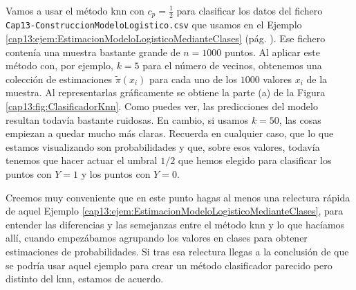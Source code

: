 \begin{ejemplo}
\label{cap13:ejem:clasificadorKnn}

Vamos a usar el método knn con $c_p = \frac{1}{2}$ para clasificar los datos del fichero {\tt Cap13-ConstruccionModeloLogistico.csv} que usamos en el Ejemplo \ref{cap13:ejem:EstimacionModeloLogisticoMedianteClases} (pág. \pageref{cap13:ejem:EstimacionModeloLogisticoMedianteClases}). Ese fichero contenía una muestra bastante grande de $n=1000$ puntos. Al aplicar este método con, por ejemplo, $k=5$ para el número de vecinos, obtenemos una colección de estimaciones $\tilde{\pi}(x_i)$ para cada uno de los $1000$ valores $x_i$ de la muestra. Al representarlas gráficamente se obtiene la parte (a) de la Figura \ref{cap13:fig:ClasificadorKnn}.  Como puedes ver, las predicciones del modelo resultan todavía bastante ruidosas. En cambio, si usamos $k=50$, las cosas empiezan a quedar mucho más claras. Recuerda en cualquier caso, que lo que estamos visualizando son probabilidades y que, sobre esos valores, todavía tenemos que hacer actuar el umbral $1/2$ que hemos elegido para clasificar los puntos con $Y=1$ y los puntos con $Y=0$.

Creemos muy conveniente que en este punto hagas al menos una relectura rápida de aquel Ejemplo \ref{cap13:ejem:EstimacionModeloLogisticoMedianteClases}, para entender las diferencias y las semejanzas entre el método knn y lo que hacíamos allí, cuando empezábamos agrupando los valores en clases para obtener estimaciones de probabilidades. Si tras esa relectura llegas a la conclusión de que se podría usar aquel ejemplo para crear un método clasificador parecido pero distinto del knn, estamos de acuerdo.
	

\end{ejemplo}
